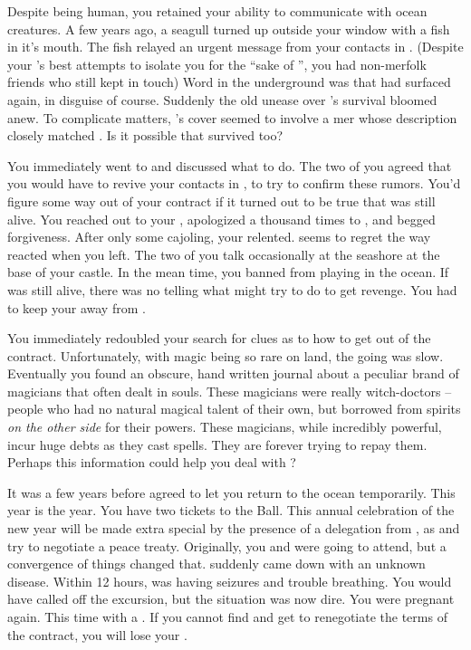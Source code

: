 \documentclass[char]{NeptuneBall}
\begin{document}
Despite being human, you retained your ability to communicate with ocean creatures. A few years ago, a seagull turned up outside your window with a fish in it's mouth. The fish relayed an urgent message from your contacts in \pAtlantis{}. (Despite your \cKing{\parent}'s best attempts to isolate you for the ``sake of \pAtlantis{}'', you had non-merfolk friends who still kept in touch) Word in the underground was that \cWitch{} had surfaced again, in disguise of course.  Suddenly the old unease over \cWitch{}'s survival bloomed anew. To complicate matters, \cWitch{}'s cover seemed to involve a mer\cSlave{\human} whose description closely matched \cSlave{}. Is it possible that \cSlave{\they} survived too? 

You immediately went to \cEric{} and discussed what to do. The two of you agreed that you would have to revive your contacts in \pAtlantis{}, to try to confirm these rumors. You'd figure some way out of your contract if it turned out to be true that \cWitch{} was still alive. You reached out to your \cKing{\parent}, apologized a thousand times to \cKing{\them}, and begged \cKing{\their} forgiveness. After only some cajoling, your \cKing{\parent} relented. \cKing{\They} seems to regret the way \cKing{\they} reacted when you left. The two of you talk occasionally at the seashore at the base of your castle.  In the mean time, you banned \cWillow{} from playing in the ocean. If \cWitch{} was still alive, there was no telling what \cWitch{\they} might try to do to get revenge. You had to keep your \cWillow{\offspring} away from \cWitch{}.

You immediately redoubled your search for clues as to how to get out of the contract. Unfortunately, with magic being so rare on land, the going was slow. Eventually you found an obscure, hand written journal about a peculiar brand of magicians that often dealt in souls. These magicians were really witch-doctors -- people who had no natural magical talent of their own, but borrowed from spirits \emph{on the other side} for their powers. These magicians, while incredibly powerful, incur huge debts as they cast spells. They are forever trying to repay them. Perhaps this information could help you deal with \cWitch{}?

It was a few years before \cKing{\King} \cKing{} agreed to let you return to the ocean temporarily. This year is the year. You have two tickets to the \cExExKing{} Ball. This annual celebration of the new year will be made extra special by the presence of a delegation from \pPacifica{}, as \pAtlantis{} and \pPacifica{} try to negotiate a peace treaty. Originally, you and \cEric{} were going to attend, but a convergence of things changed that. \cEric{} suddenly came down with an unknown disease. Within 12 hours, \cEric{} was having seizures and trouble breathing. You would have called off the excursion, but the situation was now dire. You were pregnant again. This time with a \cArielsSon{\offspring}. If you cannot find \cWitch{} and get \cWitch{\them} to renegotiate the terms of the contract, you will lose your \cArielsSon{\offspring} \cArielsSon{}.
\end{document}
